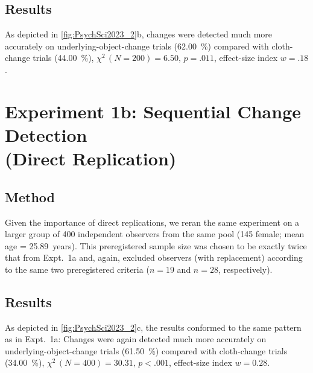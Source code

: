 \subsection{Results}

As depicted in \cref{fig:PsychSci2023_2}b, changes were detected much more accurately on underlying-object-change trials (\qty{62.00}{\percent}) compared with cloth-change trials (\qty{44.00}{\percent}), $\chi^2\,(N = 200) = 6.50,\,p = .011$, effect-size index $w = .18$.

\section[Experiment 1b: Sequential Change Detection (Direct Replication)]{Experiment 1b: Sequential Change Detection \\ (Direct Replication)}
\subsection{Method}

Given the importance of direct replications, we reran the same experiment on a larger group of 400 independent observers from the same pool (145 female; mean age = 25.89~years). This preregistered sample size was chosen to be exactly twice that from Expt.~1a and, again, excluded observers (with replacement) according to the same two preregistered criteria ($n = 19$ and $n = 28$, respectively).

\subsection{Results}

As depicted in \cref{fig:PsychSci2023_2}c, the results conformed to the same pattern as in Expt.~1a: Changes were again detected much more accurately on underlying-object-change trials (\qty{61.50}{\percent}) compared with cloth-change trials (\qty{34.00}{\percent}), $\chi^2\,(N = 400) = 30.31,\,p < .001$, effect-size index $w = 0.28$.

